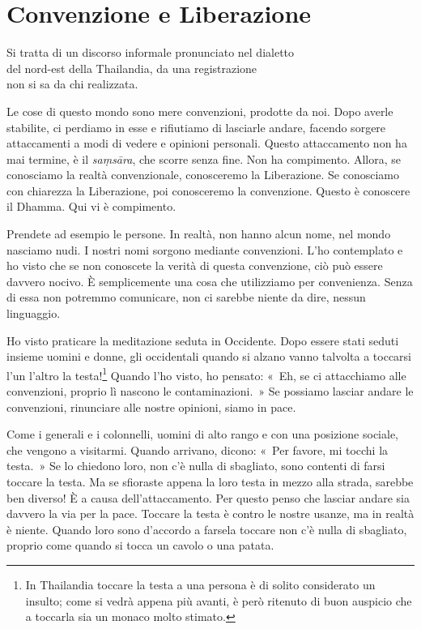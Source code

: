 \chapter{Convenzione e Liberazione}

\begin{openingQuote}
  \centering

  Si tratta di un discorso informale pronunciato nel dialetto\\
  del nord-est della Thailandia, da una registrazione\\
  non si sa da chi realizzata.
\end{openingQuote}

Le cose di questo mondo sono mere convenzioni, prodotte da noi. Dopo
averle stabilite, ci perdiamo in esse e rifiutiamo di lasciarle andare,
facendo sorgere attaccamenti a modi di vedere e opinioni personali.
Questo attaccamento non ha mai termine, è il \emph{saṃsāra}, che scorre
senza fine. Non ha compimento. Allora, se conosciamo la realtà
convenzionale, conosceremo la Liberazione. Se conosciamo con chiarezza
la Liberazione, poi conosceremo la convenzione. Questo è conoscere il
Dhamma. Qui vi è compimento.

Prendete ad esempio le persone. In realtà, non hanno alcun nome, nel
mondo nasciamo nudi. I nostri nomi sorgono mediante convenzioni. L'ho
contemplato e ho visto che se non conoscete la verità di questa
convenzione, ciò può essere davvero nocivo. È semplicemente una cosa che
utilizziamo per convenienza. Senza di essa non potremmo comunicare, non
ci sarebbe niente da dire, nessun linguaggio.

Ho visto praticare la meditazione seduta in Occidente. Dopo essere stati
seduti insieme uomini e donne, gli occidentali quando si alzano vanno
talvolta a toccarsi l'un l'altro la testa!\footnote{In Thailandia
  toccare la testa a una persona è di solito considerato un insulto;
  come si vedrà appena più avanti, è però ritenuto di buon auspicio che
  a toccarla sia un monaco molto stimato.} Quando l'ho visto, ho
pensato: «~Eh, se ci attacchiamo alle convenzioni, proprio lì nascono le
contaminazioni.~» Se possiamo lasciar andare le convenzioni, rinunciare
alle nostre opinioni, siamo in pace.

Come i generali e i colonnelli, uomini di alto rango e con una posizione
sociale, che vengono a visitarmi. Quando arrivano, dicono: «~Per favore,
mi tocchi la testa.~» Se lo chiedono loro, non c'è nulla di sbagliato,
sono contenti di farsi toccare la testa. Ma se sfioraste appena la loro
testa in mezzo alla strada, sarebbe ben diverso! È a causa
dell'attaccamento. Per questo penso che lasciar andare sia davvero la
via per la pace. Toccare la testa è contro le nostre usanze, ma in
realtà è niente. Quando loro sono d'accordo a farsela toccare non c'è
nulla di sbagliato, proprio come quando si tocca un cavolo o una patata.

